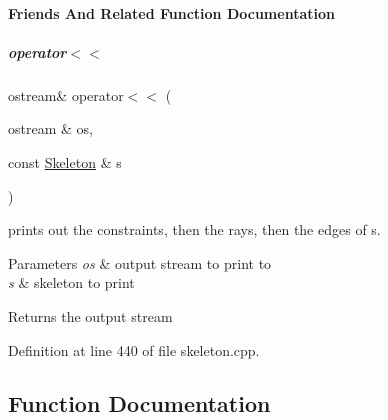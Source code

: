 \paragraph{Friends And Related Function Documentation}
\mbox{\label{group___c_l_s_solvers_a54f8dc187ec3e238ccc80d7a44b9ca82}} 
\subparagraph{\texorpdfstring{operator$<$$<$}{operator<<}}
{\footnotesize\ttfamily ostream\& operator$<$$<$ (\begin{DoxyParamCaption}\item[{ostream \&}]{os,  }\item[{const \hyperlink{group___c_l_s_solvers_class_l_p___solvers_1_1_skeleton}{Skeleton} \&}]{s }\end{DoxyParamCaption})\hspace{0.3cm}{\ttfamily [friend]}}



prints out the constraints, then the rays, then the edges of {\ttfamily s}. 


\begin{DoxyParams}{Parameters}
{\em os} & output stream to print to \\
\hline
{\em s} & skeleton to print \\
\hline
\end{DoxyParams}
\begin{DoxyReturn}{Returns}
the output stream 
\end{DoxyReturn}


Definition at line 440 of file skeleton.\+cpp.



\subsection{Function Documentation}
\mbox{\label{group___c_l_s_solvers_gaf3434d5c281c16ef7a09d8f73445ea00}} 
